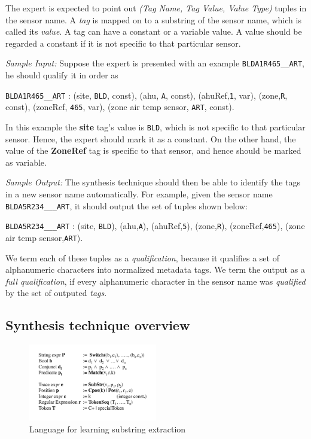 The expert is expected to point out \emph{(Tag Name, Tag Value, Value Type)} tuples in the sensor name. A {\it tag} is mapped on to a substring of the sensor name, which is called its {\it value}. A tag can have a constant or a variable value. A value should be regarded a constant if it is not specific to that particular sensor. 

{\it Sample Input:} Suppose the expert is presented with an example \texttt{BLDA1R465\_\_ART}, he should qualify it in order as

 \texttt{BLDA1R465\_\_ART} : (site, \texttt{BLD}, const), (ahu, \texttt{A}, const), (ahuRef,\texttt{1}, var), (zone,\texttt{R}, const), (zoneRef, \texttt{465}, var), (zone air temp sensor, \texttt{ART}, const). 

In this example the {\bf site} tag's value is \texttt{BLD}, which is not specific to that particular sensor. Hence, the expert should mark it as a constant. On the other hand, the value of the {\bf ZoneRef} tag is specific to that sensor, and hence should be marked as variable.

{\it Sample Output:} The synthesis technique should then be able to identify the tags in a new sensor name automatically. For example, given the sensor name \texttt{BLDA5R234\_\_\_ART}, it should output the set of tuples shown below:

\texttt{BLDA5R234\_\_\_ART} : (site, \texttt{BLD}), (ahu,\texttt{A}), (ahuRef,\texttt{5}), (zone,\texttt{R}), (zoneRef,\texttt{465}), (zone air temp sensor,\texttt{ART}).

We term each of these tuples as a {\it qualification}, because it qualifies a set of alphanumeric characters into normalized metadata tags. We term the output as a {\it full qualification}, if every alphanumeric character in the sensor name was {\it qualified} by the set of outputed {\it tags}.


\subsection{Synthesis technique overview}
\begin{figure}[h!]
  
  \centering
    \includegraphics[width=0.5\textwidth]{figs/stringLanguage.pdf}
\caption{Language for learning substring extraction}
\label{fig:language}
\end{figure}


